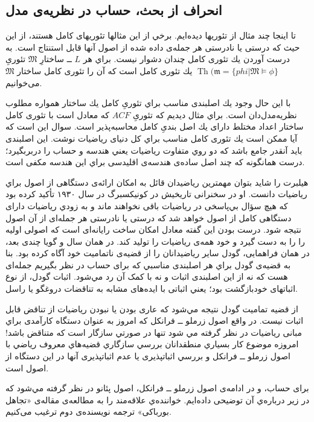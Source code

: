 \documentclass[12pt,a4paper]{article}
\theoremstyle{colorhead}
\DeclareMathOperator{\Th}{Th}
\begin{document}
\subsection{انحراف از بحث، حساب در نظریه‌ی مدل}
تا اينجا چند مثال از تئوریها ديده‌ايم. برخي از اين مثالها تئوریهای كامل هستند، از اين حيث كه درستی يا نادرستی هر جمله‌ی داده شده از اصول آنها قابل استنتاج است. به درست آوردن يك تئوری كامل چندان دشوار نيست. براي هر
$L$ ـ‌ـ
ساختارِ
$\mathfrak{M}$
تئوریِ
$\Th(\mathfrak{m}=\{phi| \mathfrak{M}\models \phi\}$ 
يك تئوری كامل است كه آن را تئوری كامل ساختار
$\mathfrak{M}$
می‌خوانیم.
\par 
 با اين حال وجود يك اصلبندی مناسب براي تئوریِ
  كامل يك ساختار همواره مطلوب نظريه‌مدل‌دان است. 
  براي مثال ديديم كه تئوریِ
$ACF$
كه معادل است با تئوری كامل ساختار اعداد مختلط
دارای يك اصل بندی‌ِ كامل  محاسبه‌پذير است.
 سوال اين است كه آيا ممکن است يك تئوری كامل مناسب براي كل دنیای رياضيات نوشت. اين اصلبندی بايد آنقدر جامع باشد كه دو روي متفاوت رياضيات يعني هندسه و حساب را دربربگيرد؛ درست همانگونه كه چند اصل ساده‌ی هندسه‌ی اقليدسی براي اين هندسه مكفی است. 
\par
هيلبرت را شايد بتوان مهمترين رياضيدان قائل به امکان  ارائه‌ی دستگاهی از اصول براي ریاضیات دانست. 
او در سخنرانی تاريخيش در کونیکسبرگ
در سال 
۱۹۳۰
تأکید 
كرده بود كه هيچ سؤال بي‌پاسخی 
در ریاضیات
باقی نخواهند ماند
و به زودي رياضيات دارای دستگاهی كامل از اصول خواهد شد كه درستی یا نادرستی هر جمله‌ای
از آن اصول نتيجه شود. درست بودن اين گفته معادل امكان ساخت رايانه‌ای است كه اصولی اوليه را را به دست گيرد و خود همه‌ی رياضيات را توليد كند.  در همان سال و گويا چندی بعد،‌ در همان فراهمايی، گودل سایر رياضيدانان را از قضيه‌ی ناتماميت  خود آگاه كرده بود. بنا به قضيه‌ی گودل براي هر اصلبندی مناسبي كه برای حساب در نظر بگيريم جمله‌ای هست كه نه از این اصلبندی  اثبات و نه با کمک آن رد مي‌شود. اثبات گودل، 
از نوع
اثباتهای خود‌بازگشت بود؛
يعني اثباتی با ایده‌های  مشابه به تناقضات دروغگو يا راسل. 
\par
از قضيه تماميت گودل نتيجه مي‌شود كه عاری بودن يا نبودن رياضيات از تناقض قابل اثبات نيست. در واقع اصول زرملو ــ فرانكل كه امروز به عنوان دستگاه کارآمدی براي مبانی رياضيات در نظر گرفته مي شود تنها در صورتي سازگار است كه متناقض باشد! امروزه موضوع كار بسياري منطقدانان بررسي سازگاري قضيه‌هاي معروف رياضي با اصول زرملو ــ فرانكل و بررسي اثباتپذيری يا عدم اثباتپذيری آنها در اين دستگاه از اصول است. 
\par 
برای حساب،‌ و در ادامه‌ی اصول زرملو ــ‌ فرانکل،
اصول پئانو در نظر گرفته مي‌شود كه در زير درباره‌ي آن توضیحی داده‌ايم. خواننده‌ي علاقه‌مند  را به مطالعه‌ی مقاله‌ی «تجاهل بورباكی» ترجمه نويسنده‌ی دوم ترغيب می‌كنيم. 
\end{document}
